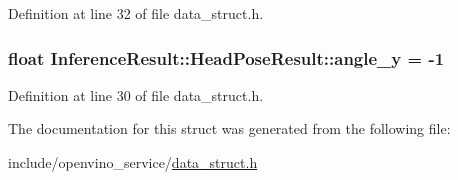 Definition at line 32 of file data\+\_\+struct.\+h.

\subsubsection[{\texorpdfstring{angle\+\_\+y}{angle_y}}]{\setlength{\rightskip}{0pt plus 5cm}float Inference\+Result\+::\+Head\+Pose\+Result\+::angle\+\_\+y = -\/1}\hypertarget{structInferenceResult_1_1HeadPoseResult_a6f9491752ad71d474f7b52f626bc6989}{}\label{structInferenceResult_1_1HeadPoseResult_a6f9491752ad71d474f7b52f626bc6989}


Definition at line 30 of file data\+\_\+struct.\+h.



The documentation for this struct was generated from the following file\+:\begin{DoxyCompactItemize}
\item 
include/openvino\+\_\+service/\hyperlink{data__struct_8h}{data\+\_\+struct.\+h}\end{DoxyCompactItemize}

